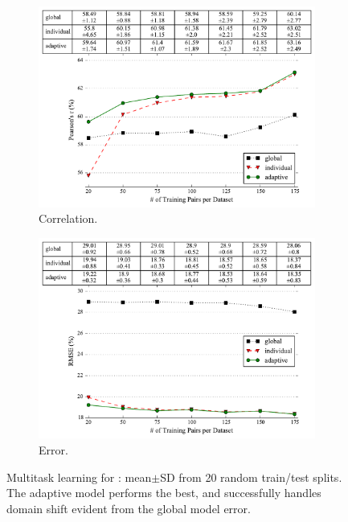\begin{figure}
    \begin{subfigure}[b]{0.5\textwidth}
        \includegraphics[scale=0.47]{2016_naacl_stsdomain/figures/sas_multitask_learning_correlations.pdf}
        \caption{Correlation.}
        \label{figure:sas-multitask-learning-correlations}
    \end{subfigure}
    \begin{subfigure}[b]{0.45\textwidth}
        \includegraphics[scale=0.47]{2016_naacl_stsdomain/figures/sas_multitask_learning_rmses.pdf}
        \caption{Error.}
        \label{figure:sas-multitask-learning-errors}
    \end{subfigure}
    \newline
    \caption{Multitask learning for \sas{}: mean$\pm$SD from 20 random
    train/test splits.  The adaptive model performs the best, and
    successfully handles domain shift evident from the global model
    error.}
    \label{figure:sas-mtl-results}
\end{figure}

